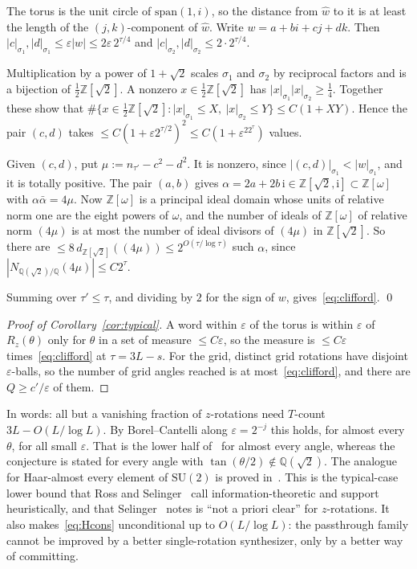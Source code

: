 \documentclass[aps,prx,twocolumn,superscriptaddress,nofootinbib,longbibliography]{revtex4-2}
\theoremstyle{plain}
\theoremstyle{definition}
\theoremstyle{remark}
\newcommand{\Z}{\mathbb{Z}}
\newcommand{\Q}{\mathbb{Q}}
\newcommand{\SU}{\mathrm{SU}(2)}
\begin{document}
The torus is the unit circle of $\mathrm{span}(1,i)$, so the distance from $\hat w$ to it is at least the length of the $(j,k)$-component of $\hat w$. Write $w=a+bi+cj+dk$. Then $|c|_{\sigma_1},|d|_{\sigma_1}\le\varepsilon|w|\le2\varepsilon\,2^{\tau/4}$ and $|c|_{\sigma_2},|d|_{\sigma_2}\le2\cdot2^{\tau/4}$.

Multiplication by a power of $1+\sqrt2$ scales $\sigma_1$ and $\sigma_2$ by reciprocal factors and is a bijection of $\tfrac12\Z[\sqrt2]$. A nonzero $x\in\tfrac12\Z[\sqrt2]$ has $|x|_{\sigma_1}|x|_{\sigma_2}\ge\tfrac14$. Together these show that $\#\{x\in\tfrac12\Z[\sqrt2]:|x|_{\sigma_1}\le X,\ |x|_{\sigma_2}\le Y\}\le C(1+XY)$. Hence the pair $(c,d)$ takes $\le C(1+\varepsilon2^{\tau/2})^2\le C(1+\varepsilon^22^\tau)$ values.

Given $(c,d)$, put $\mu:=n_{\tau'}-c^2-d^2$. It is nonzero, since $|(c,d)|_{\sigma_1}<|w|_{\sigma_1}$, and it is totally positive. The pair $(a,b)$ gives $\alpha=2a+2b\,\mathrm i\in\Z[\sqrt2,\mathrm i]\subset\Z[\omega]$ with $\alpha\bar\alpha=4\mu$. Now $\Z[\omega]$ is a principal ideal domain whose units of relative norm one are the eight powers of $\omega$, and the number of ideals of $\Z[\omega]$ of relative norm $(4\mu)$ is at most the number of ideal divisors of $(4\mu)$ in $\Z[\sqrt2]$. So there are $\le8\,d_{\Z[\sqrt2]}((4\mu))\le2^{O(\tau/\log\tau)}$ such $\alpha$, since $|N_{\Q(\sqrt2)/\Q}(4\mu)|\le C2^{\tau}$.

Summing over $\tau'\le\tau$, and dividing by $2$ for the sign of $w$, gives~\eqref{eq:clifford}. \qed

\begin{proof}[Proof of Corollary~\ref{cor:typical}]
A word within $\varepsilon$ of the torus is within $\varepsilon$ of $R_z(\theta)$ only for $\theta$ in a set of measure $\le C\varepsilon$, so the measure is $\le C\varepsilon$ times~\eqref{eq:clifford} at $\tau=3L-s$. For the grid, distinct grid rotations have disjoint $\varepsilon$-balls, so the number of grid angles reached is at most~\eqref{eq:clifford}, and there are $Q\ge c'/\varepsilon$ of them.
\end{proof}
In words: all but a vanishing fraction of $z$-rotations need $T$-count $3L-O(L/\log L)$. By Borel--Cantelli along $\varepsilon=2^{-j}$ this holds, for almost every $\theta$, for all small $\varepsilon$. That is the lower half of~\cite[Conj.~8.10]{RossSelinger} for almost every angle, whereas the conjecture is stated for every angle with $\tan(\theta/2)\notin\Q(\sqrt2)$. The analogue for Haar-almost every element of $\SU$ is proved in~\cite{SMA}. This is the typical-case lower bound that Ross and Selinger~\cite{RossSelinger} call information-theoretic and support heuristically, and that Selinger~\cite[\S9]{Selinger15} notes is ``not a priori clear'' for $z$-rotations. It also makes~\eqref{eq:Hcons} unconditional up to $O(L/\log L)$: the passthrough family cannot be improved by a better single-rotation synthesizer, only by a better way of committing.
\end{document}
